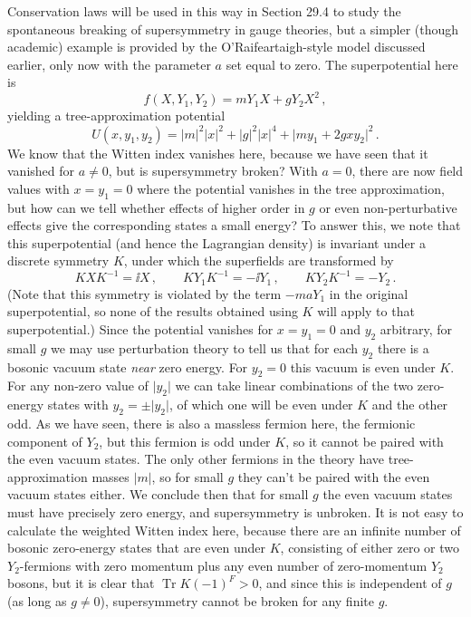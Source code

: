 Conservation laws will be used in this way in Section 29.4 to study the
spontaneous breaking of supersymmetry in gauge theories, but a simpler
(though academic) example is provided by the O'Raifeartaigh-style model
discussed earlier, only now with the parameter \(a\) set equal to zero.
The superpotential here is
\begin{equation}
  f(X,Y_1,Y_2)=mY_1X+gY_2X^2\,,
  \tag{29.1.8}\label{eq:29.1.8}
\end{equation}
yielding a tree-approximation potential
\begin{equation}
  U(x,y_1,y_2)
  =
  \lvert m\rvert^2\lvert x\rvert^2
  +\lvert g\rvert^2\lvert x\rvert^4
  +\lvert my_1+2gxy_2\rvert^2\,.
  \tag{29.1.9}\label{eq:29.1.9}
\end{equation}
We know that the Witten index vanishes here, because we have seen that it
vanished for \(a\ne0\), but is supersymmetry broken? With \(a=0\), there
are now field values with \(x=y_1=0\) where the potential vanishes in the
tree approximation, but how can we tell whether effects of higher order
in \(g\) or even non-perturbative effects give the corresponding states a
small energy? To answer this, we note that this superpotential (and hence
the Lagrangian density) is invariant under a discrete symmetry \(K\),
under which the superfields are transformed by
\begin{equation}
  KXK^{-1}=\ii X\,,
  \qquad
  KY_1K^{-1}=-\ii Y_1\,,
  \qquad
  KY_2K^{-1}=-Y_2\,.
  \tag{29.1.10}\label{eq:29.1.10}
\end{equation}
(Note that this symmetry is violated by the term \(-maY_1\) in the
original superpotential, so none of the results obtained using \(K\) will
apply to that superpotential.) Since the potential vanishes for
\(x=y_1=0\) and \(y_2\) arbitrary, for small \(g\) we may use
perturbation theory to tell us that for each \(y_2\) there is a bosonic
vacuum state \emph{near} zero energy. For \(y_2=0\) this vacuum is even
under \(K\). For any non-zero value of \(\lvert y_2\rvert\) we can take
linear combinations of the two zero-energy states with
\(y_2=\pm\lvert y_2\rvert\), of which one will be even under \(K\) and
the other odd. As we have seen, there is also a massless fermion here,
the fermionic component of \(Y_2\), but this fermion is odd under \(K\),
so it cannot be paired with the even vacuum states. The only other
fermions in the theory have tree-approximation masses \(\lvert m\rvert\),
so for small \(g\) they can't be paired with the even vacuum states
either. We conclude then that for small \(g\) the even vacuum states must
have precisely zero energy, and supersymmetry is unbroken. It is not easy
to calculate the weighted Witten index here, because there are an infinite
number of bosonic zero-energy states that are even under \(K\), consisting
of either zero or two \(Y_2\)-fermions with zero momentum plus any even
number of zero-momentum \(Y_2\) bosons, but it is clear that
\(\operatorname{Tr}K(-1)^F>0\), and since this is independent of \(g\) (as
long as \(g\ne0\)), supersymmetry cannot be broken for any finite \(g\).
